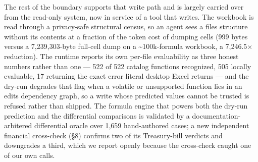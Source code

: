 \documentclass[
]{article}
\begin{document}
The rest of the boundary supports that write path and is largely carried
over from the read-only system, now in service of a tool that writes.
The workbook is read through a privacy-safe structural census, so an
agent sees a file\textquotesingle s structure without its contents at a
fraction of the token cost of dumping cells (999 bytes versus a
7,239,303-byte full-cell dump on a \textasciitilde100k-formula workbook,
a 7,246.5× reduction). The runtime reports its own per-file evaluability
as three honest numbers rather than one --- 522 of 522 catalog functions
recognized, 505 locally evaluable, 17 returning the exact error literal
desktop Excel returns --- and the dry-run degrades that flag when a
volatile or unsupported function lies in an edit\textquotesingle s
dependency graph, so a write whose predicted values cannot be trusted is
refused rather than shipped. The formula engine that powers both the
dry-run prediction and the differential comparisons is validated by a
documentation-arbitered differential oracle over 1,659 hand-authored
cases; a new independent financial cross-check (§8) confirms two of its
Treasury-bill verdicts and downgrades a third, which we report openly
because the cross-check caught one of our own calls.
\end{document}
